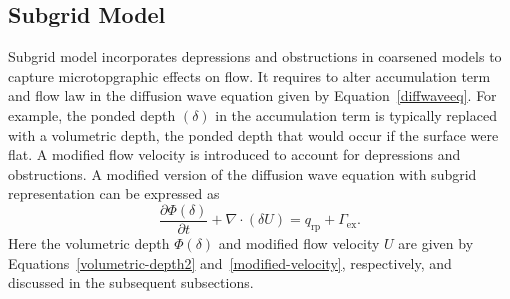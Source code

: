 \documentclass[review,11pt]{elsarticle}
\begin{document}
\subsection{Subgrid Model}\label{subgridmodel}
Subgrid model incorporates depressions and obstructions in coarsened models to capture microtopgraphic effects on flow. It requires to alter accumulation term and flow law in the diffusion wave equation given by Equation~\ref{diffwaveeq}.
For example, the ponded depth $(\delta)$ in the accumulation term is typically replaced with a volumetric depth, the ponded depth that would occur if the surface were flat. A modified flow velocity is introduced to account for depressions and obstructions. A modified version of the diffusion wave equation with subgrid representation can be expressed as
\begin{equation}\label{diffwaveeq}
\frac{\partial \Phi (\delta)}{\partial t} + \nabla \cdot (\delta U)= q_\text{rp} + \Gamma_\text{ex}.
\end{equation}
Here the volumetric depth $\Phi (\delta)$ and modified flow velocity $U$ are given by Equations~\ref{volumetric-depth2} and~\ref{modified-velocity}, respectively, and discussed in the subsequent subsections.
\end{document}
